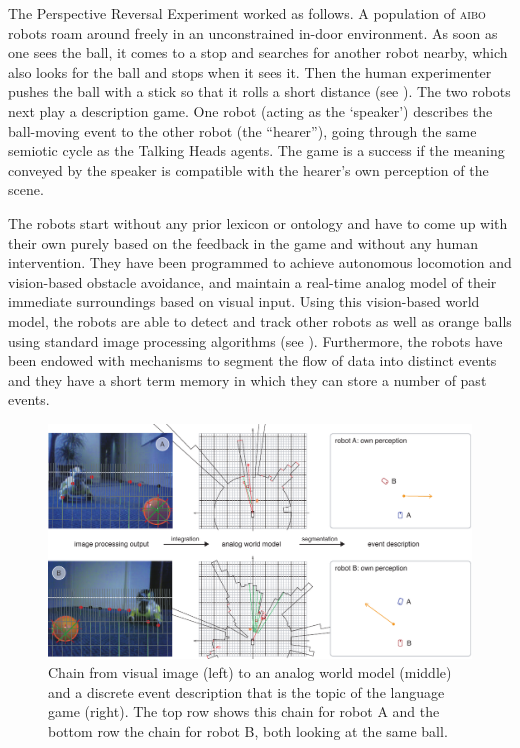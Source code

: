 \enlargethispage{1\baselineskip}
The Perspective Reversal Experiment worked as follows. A population of \textsc{aibo} robots roam around
freely in an unconstrained in-door environment. As soon as one sees the
ball, it comes to a stop and searches for another robot nearby, which also
looks for the ball and stops when it sees it. Then the human
experimenter pushes the ball with a stick so that it rolls a short
distance (see ). The two robots next play a description game. One robot (acting as the `speaker') 
describes the ball-moving event to the other robot (the ``hearer''), going through the same semiotic cycle as the Talking 
Heads agents. The game is a success if the meaning conveyed by the speaker is compatible with the hearer's 
own perception of the scene. 

The robots start without any prior lexicon or ontology and have to come up with their own 
purely based on the feedback in the game and without any human intervention. 
They have been programmed to achieve autonomous locomotion and vision-based obstacle avoidance,
and maintain a real-time analog model of their immediate surroundings based on visual input. Using
this vision-based world model, the robots are able to detect and track
other robots as well as orange balls using standard image processing
algorithms (see ). Furthermore, the
robots have been endowed with mechanisms to segment the flow of data
into distinct events and they have a short term memory in which they
can store a number of past events.

\begin{figure}[p]
  \centerline{\includegraphics[width=.90\textwidth]{chap10/figs/persp-rev-perception.pdf}}
\caption{\label{fig:persp-rev-perception}Chain from visual image (left) to an analog world model (middle) and a discrete event description
that is the topic of the language game (right). 
The top row shows this chain for robot A and the bottom row the chain for robot B, both looking at the same ball.}
\end{figure}

